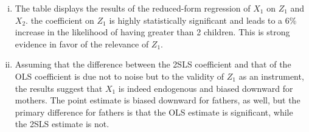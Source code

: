 \documentclass{article}
\begin{document}
\begin{enumerate}[(i)]
	\item The table displays the results of the reduced-form regression of $X_1$ on $Z_1$ and $X_2$. the coefficient on $Z_1$ is highly statistically significant and leads to a 6\% increase in the likelihood of having greater than 2 children. This is strong evidence in favor of the relevance of $Z_1$.
		\begin{center}  \end{center}
	
	\item Assuming that the difference between the 2SLS coefficient and that of the OLS coefficient is due not to noise but to the validity of $Z_1$ as an instrument, the results suggest that $X_1$ is indeed endogenous and biased downward for mothers. The point estimate is biased downward for fathers, as well, but the primary difference for fathers is that the OLS estimate is significant, while the 2SLS estimate is not.
		\begin{center}  \end{center}
	
\end{enumerate}

\end{document}
